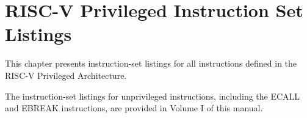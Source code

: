 \chapter{RISC-V Privileged Instruction Set Listings}

This chapter presents instruction-set listings for all instructions
defined in the RISC-V Privileged Architecture.

The instruction-set listings for unprivileged instructions, including the
ECALL and EBREAK instructions, are provided in Volume I of this manual.


